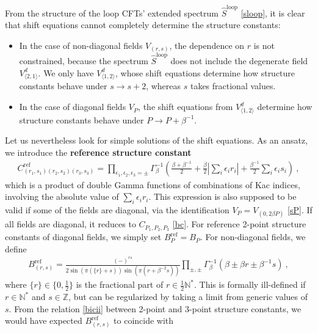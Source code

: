 \documentclass[12pt, a4paper]{article}
\newcommand{\myindex}[1]{\textbf{\boldmath #1}}
\begin{document}
From the structure of the loop CFTs' extended spectrum $\widehat{S}^\text{loop}$ \eqref{sloop}, it is clear that shift equations cannot completely determine the structure constants:
\begin{itemize}
 \item In the case of non-diagonal fields $V_{(r,s)}$, the dependence on $r$ is not constrained, because the spectrum $\widehat{S}^\text{loop}$ does not include the degenerate field $V_{\langle 2,1\rangle}^d$. We only have $V^d_{\langle 1,2\rangle}$, whose shift equations determine how structure constants behave under $s\to s+2$, whereas $s$ takes fractional values.
 \item In the case of diagonal fields $V_P$, the shift equations from $V^d_{\langle 1,2\rangle}$ determine how structure constants behave under $P\to P+\beta^{-1}$. 
\end{itemize}
Let us nevertheless look for simple solutions of the shift equations. As an ansatz, we introduce the \myindex{reference structure constant}
\begin{align}
\boxed{C^\text{ref}_{(r_1,s_1)(r_2,s_2)(r_3,s_3)} =\prod_{\epsilon_1,\epsilon_2,\epsilon_3=\pm} \Gamma_\beta^{-1} \left(\tfrac{\beta+\beta^{-1}}{2} + \tfrac{\beta}{2}\left|\textstyle{\sum_i} \epsilon_ir_i\right| + \tfrac{\beta^{-1}}{2}\textstyle{\sum_i} \epsilon_is_i\right)}\ ,
 \label{cref}
\end{align}
which is a product of double Gamma functions of combinations of Kac indices, involving the absolute value of $\sum_i\epsilon_i r_i$. 
This expression is also supposed to be valid if some of the fields are diagonal, via the identification $V_P = V_{(0,2\beta P)}$ \eqref{sP}. If all fields are diagonal, it reduces to $C_{P_1,P_2,P_3}$ \eqref{bc}. 
For reference 2-point structure constants of diagonal fields, we simply set $B^\text{ref}_P = B_P$. For non-diagonal fields, we define 
\begin{align}
 \boxed{B^\text{ref}_{(r,s)} = \frac{(-)^{rs}}{2\sin\left(\pi(\{r\}+s)\right)\sin\left(\pi(r+\beta^{-2}s)\right)}\prod_{\pm,\pm}\Gamma_\beta^{-1}\left(\beta\pm \beta r \pm \beta^{-1}s\right)} \ ,
 \label{bref}
 \end{align}
 where $\{r\}\in\{0,\frac12\}$ is the fractional part of $r\in\frac12\mathbb{N}^*$. This is formally ill-defined if $r\in\mathbb{N}^*$ and $s\in\mathbb{Z}$, but can be regularized by taking a limit from generic values of $s$. 
 From the relation \eqref{bicii} between 2-point and 3-point structure constants, we would have expected $B^\text{ref}_{(r,s)}$ to coincide with 
\end{document}
